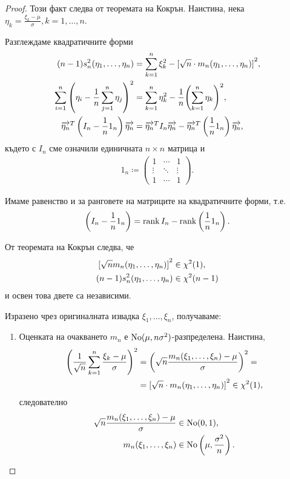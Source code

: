 \documentclass[numbers=endperiod, bibliography=totocnumbered]{scrartcl}
\begin{document}
\begin{proof}
  Този факт следва от теоремата на Кокрън. Наистина, нека \( \eta_k = \frac {\xi_k - \mu} \sigma, k = 1, \ldots, n \).

  Разглеждаме квадратичните форми
  \begin{align*}
    (n-1) s_n^2(\eta_1, \ldots, \eta_n)
    &=
    \sum_{k=1}^n \xi_k^2 - {[\sqrt n \cdot m_n(\eta_1, \ldots, \eta_n)]}^2,
    \\
    \sum_{i=1}^n {\left(\eta_i - \frac 1 n \sum_{j=1}^n \eta_j \right)}^2
    &=
    \sum_{k=1}^n \eta_k^2 - \frac 1 n {\left(\sum_{k=1}^n \eta_k \right)}^2,
    \\
    \overrightarrow{\eta_n}^T \left(I_n - \frac 1 n 1_n \right) \overrightarrow{\eta_n}
    &=
    \overrightarrow{\eta_n}^T I_n \overrightarrow{\eta_n} - \overrightarrow{\eta_n}^T \left(\frac 1 n 1_n \right) \overrightarrow{\eta_n},
  \end{align*}
  където с \( I_n \) сме означили единичната \( n \times n \) матрица и
  \begin{align*}
    1_n
    \coloneqq
    \begin{pmatrix}
      1 & \cdots & 1 \\
      \vdots & \ddots & \vdots \\
      1 & \cdots & 1
    \end{pmatrix}.
  \end{align*}

  Имаме равенство и за ранговете на матриците на квадратичните форми, т.е.
  \begin{equation*}
    \left(I_n - \frac 1 n 1_n \right) = \operatorname{rank} I_n - \operatorname{rank} \left( \frac 1 n 1_n \right).
  \end{equation*}

  От теоремата на Кокрън следва, че
  \begin{align*}
    {[\sqrt n m_n(\eta_1, \ldots, \eta_n)]}^2 &\in \chi^2(1),
    \\
    (n-1) s_n^2(\eta_1, \ldots, \eta_n) &\in \chi^2(n - 1)
  \end{align*}
  и освен това двете са независими.

  Изразено чрез оригиналната извадка \( \xi_1, \ldots, \xi_n \), получаваме:
  \begin{enumerate}
    \item Оценката на очакването \( m_n \) е \( \operatorname{No}(\mu, n \sigma^2) \)-разпределена. Наистина,
    \begin{align*}
      {\left(\frac 1 {\sqrt n} \sum_{k=1}^n \frac {\xi_k - \mu} \sigma \right)}^2
      &=
      {\left( \sqrt n \frac {m_n(\xi_1, \ldots, \xi_n) - \mu} \sigma \right)}^2
      = \\ &=
      {[\sqrt n \cdot m_n(\eta_1, \ldots, \eta_n)]}^2
      \in
      \chi^2(1),
    \end{align*}
    следователно
    \begin{align*}
      \sqrt n \frac {m_n(\xi_1, \ldots, \xi_n) - \mu} \sigma &\in \operatorname{No}(0, 1),
      \\
      m_n(\xi_1, \ldots, \xi_n) &\in \operatorname{No} \left(\mu, \frac {\sigma^2} n \right).
    \end{align*}


\end{enumerate}
\end{proof}
\end{document}
